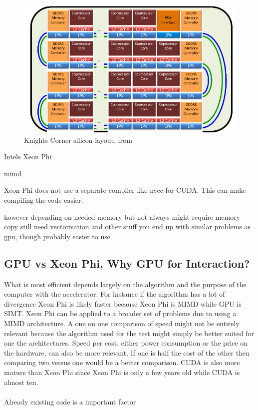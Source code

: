 \documentclass[10pt,a4paper]{report}
\begin{document}
\begin{figure}[h]
    \centering
    \includegraphics[width=12cm]{knigths_corner_silicon_layout.png}
    \caption{Knights Corner silicon layout, from\cite{intel_knights_corner}}
    \label{fig:knights_corner_layout}
\end{figure}

Intels Xeon Phi 

mimd

Xeon Phi does not use a separate compiler like nvcc for CUDA\cite{jeffers2013intel}. This can make compiling the code easier.

however depending on needed memory but not always might require memory copy
still need vectorisation and other stuff
you end up with similar problems as gpu, though probably easier to use

\subsection{GPU vs Xeon Phi, Why GPU for Interaction?}
\label{gpu_gwas}
What is most efficient depends largely on the algorithm and the purpose of the computer with the accelerator. For instance if the algorithm has a lot of divergence Xeon Phi is likely faster because Xeon Phi is MIMD while GPU is SIMT. Xeon Phi can be applied to a broader set of problems due to using a MIMD architecture\cite{jeffers2013intel}. A one on one comparison of speed might not be entirely relevant because the algorithm used for the test might simply be better suited for one the architectures. Speed per cost, either power consumption or the price on the hardware, can also be more relevant. If one is half the cost of the other then comparing two versus one would be a better comparison. CUDA is also more mature than Xeon Phi since Xeon Phi is only a few years old while CUDA is almost ten\cite{cuda, jeffers2013intel}.\\
\\
Already existing code is a important factor
\end{document}
